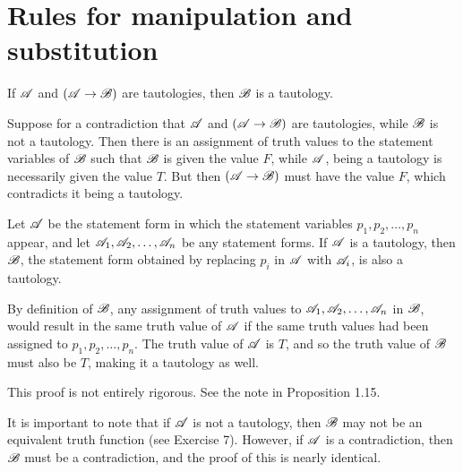 \section{Rules for manipulation and substitution}

\setcounter{definition}{9}
\begin{proposition}
  If \(\mathscr{A}\) and \((\mathscr{A} \rightarrow \mathscr{B})\) are tautologies, then \(\mathscr{B}\) is a tautology.

  \prf{} Suppose for a contradiction that \(\mathscr{A}\) and \((\mathscr{A} \rightarrow \mathscr{B})\) are tautologies, while \(\mathscr{B}\) is not a tautology. Then there is an assignment of truth values to the statement variables of \(\mathscr{B}\) such that \(\mathscr{B}\) is given the value \(F\), while \(\mathscr{A}\), being a tautology is necessarily given the value \(T\). But then \((\mathscr{A} \rightarrow \mathscr{B})\) must have the value \(F\), which contradicts it being a tautology.
\end{proposition}

\begin{proposition}
  Let \(\mathscr{A}\) be the statement form in which the statement variables \(p_1, p_2, \dots, p_n\) appear, and let \(\mathscr{A}_1, \mathscr{A}_2, \dots, \mathscr{A}_n\) be any statement forms. If \(\mathscr{A}\) is a tautology, then \(\mathscr{B}\), the statement form obtained by replacing \(p_i\) in \(\mathscr{A}\) with \(\mathscr{A}_i\), is also a tautology.

  \prf{} By definition of \(\mathscr{B}\), any assignment of truth values to \(\mathscr{A}_1, \mathscr{A}_2, \dots, \mathscr{A}_n\) in \(\mathscr{B}\), would result in the same truth value of \(\mathscr{A}\) if the same truth values had been assigned to \(p_1, p_2, \dots, p_n\). The truth value of \(\mathscr{A}\) is \(T\), and so the truth value of \(\mathscr{B}\) must also be \(T\), making it a tautology as well.

  \note{} This proof is not entirely rigorous. See the note in Proposition 1.15.

  \note{} It is important to note that if \(\mathscr{A}\) is not a tautology, then \(\mathscr{B}\) may not be an equivalent truth function (see Exercise 7). However, if \(\mathscr{A}\) is a contradiction, then \(\mathscr{B}\) must be a contradiction, and the proof of this is nearly identical.
\end{proposition}

